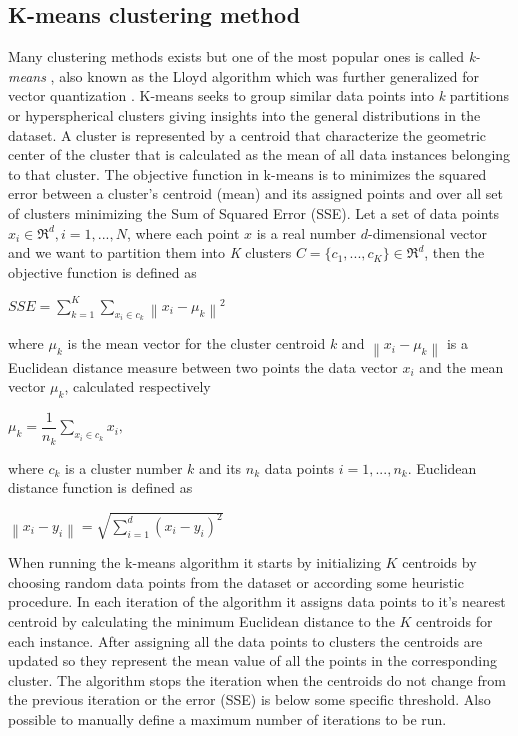 \subsection{K-means clustering method}
Many clustering methods exists but one of the most popular ones is called \textit{k-means} \citep{FORGYE.W.:1965,MacQueen:1967KMeans}, also known as the Lloyd algorithm \citep{Lloyd:1982} which was further generalized for vector quantization \citep{Linde:1980VQ}. K-means seeks to group similar data points into \textit{k} partitions or hyperspherical clusters giving insights into the general distributions in the dataset. A cluster is represented by a centroid that characterize the geometric center of the cluster that is calculated as the mean of all data instances belonging to that cluster. The objective function in k-means is to minimizes the squared error between a cluster's centroid (mean) and its assigned points and over all set of clusters minimizing the Sum of Squared Error (SSE). Let a set of data points $x_i \in \Re^d, i=1,...,N$, where each point $x$ is a real number $d$-dimensional vector and we want to partition them into \textit{K} clusters $C=\{c_1,...,c_K\} \in \Re^d$, then the objective function is defined as

\begin{center}
$SSE =\displaystyle \sum_{k=1}^{K}\displaystyle \sum_{x_i \in c_k}\left \| x_i-\mu_k \right \|^2$ 
\end{center}


where $\mu_k$ is the mean vector for the cluster centroid $k$ and $\left \| x_i-\mu_k \right \|$ is a Euclidean distance measure between two points the data vector $x_i$ and the mean vector $\mu_k$, calculated respectively

\begin{center}
$\mu_k = \dfrac{1}{n_k}\displaystyle \sum_{x_i \in c_k}x_i,$ 
\end{center}

where $c_k$ is a cluster number $k$ and its $n_k$ data points $i=1,...,n_k$. Euclidean distance function is defined as

\begin{center}
$\left \| x_i-y_i \right \| = \sqrt{\displaystyle \sum_{i=1}^{d}(x_i-y_i)^2} $
\end{center}

When running the k-means algorithm it starts by initializing $K$ centroids by choosing random data points from the dataset or according some heuristic procedure. In each iteration of the algorithm it assigns data points to it's nearest centroid by calculating the minimum Euclidean distance to the $K$ centroids for each instance. After assigning all the data points to clusters the centroids are updated so they represent the mean value of all the points in the corresponding cluster. The algorithm stops the iteration when the centroids do not change from the previous iteration or the error (SSE) is below some specific threshold. Also possible to manually define a maximum number of iterations to be run. 


